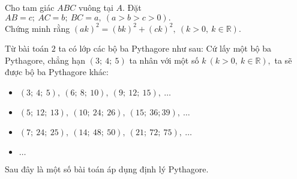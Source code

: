 \begin{bt}%
Cho tam giác $ABC$ vuông tại $A.$ Đặt $AB=c;\ AC=b;\ BC=a,\ (a>b>c>0).$\\ Chứng minh rằng $(ak)^2=(bk)^2+(ck)^2,\ (k>0,\ k\in\mathbb{R}). $
\begin{nx} Từ bài toán $2$ ta có lớp các bộ ba Pythagore như sau: Cứ lấy một bộ ba Pythagore, chẳng hạn $(3;\ 4;\ 5)$ ta nhân với một số $k\ (k>0,\ k\in\mathbb{R}),$ ta sẽ được bộ ba Pythagore khác:
\begin{itemize}
\item $(3;\ 4;\ 5),\ (6;\ 8;\ 10),\ (9;\ 12;\ 15),\ \ldots$
\item $(5;\ 12;\ 13),\ (10;\ 24;\ 26),\ (15;\ 36; 39),\ \ldots$
\item $(7;\ 24;\ 25),\ (14;\ 48;\ 50),\ (21;\ 72;\ 75),\ \ldots$
\item $\ldots$ 
\end{itemize} Sau đây là một số bài toán áp dụng định lý Pythagore.
\end{nx}
\end{bt}

